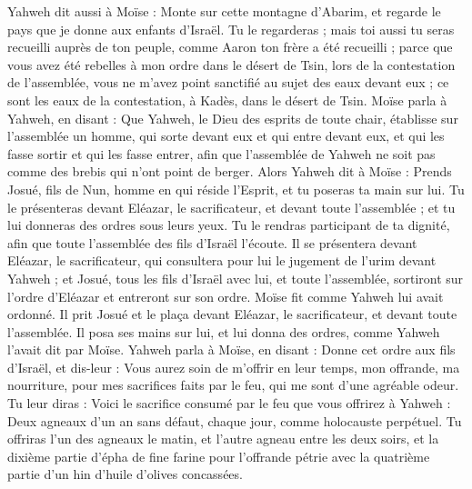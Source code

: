 \begin{multicols}{2}
Yahweh dit aussi à Moïse : Monte sur cette montagne d'Abarim, et regarde le pays que je donne aux enfants d'Israël.
Tu le regarderas ; mais toi aussi tu seras recueilli auprès de ton peuple, comme Aaron ton frère a été recueilli ;
parce que vous avez été rebelles à mon ordre dans le désert de Tsin, lors de la contestation de l'assemblée, vous ne m'avez point sanctifié au sujet des eaux devant eux ; ce sont les eaux de la contestation, à Kadès, dans le désert de Tsin.
Moïse parla à Yahweh, en disant :
Que Yahweh, le Dieu des esprits de toute chair, établisse sur l'assemblée un homme,
qui sorte devant eux et qui entre devant eux, et qui les fasse sortir et qui les fasse entrer, afin que l'assemblée de Yahweh ne soit pas comme des brebis qui n'ont point de berger.
Alors Yahweh dit à Moïse : Prends Josué, fils de Nun, homme en qui réside l'Esprit, et tu poseras ta main sur lui.
Tu le présenteras devant Eléazar, le sacrificateur, et devant toute l'assemblée ; et tu lui donneras des ordres sous leurs yeux.
Tu le rendras participant de ta dignité, afin que toute l'assemblée des fils d'Israël l'écoute.
Il se présentera devant Eléazar, le sacrificateur, qui consultera pour lui le jugement de l'urim devant Yahweh ; et Josué, tous les fils d'Israël avec lui, et toute l'assemblée, sortiront sur l'ordre d'Eléazar et entreront sur son ordre.
Moïse fit comme Yahweh lui avait ordonné. Il prit Josué et le plaça devant Eléazar, le sacrificateur, et devant toute l'assemblée.
Il posa ses mains sur lui, et lui donna des ordres, comme Yahweh l'avait dit par Moïse.
\VerseOne{}Yahweh parla à Moïse, en disant :
Donne cet ordre aux fils d'Israël, et dis-leur : Vous aurez soin de m'offrir en leur temps, mon offrande, ma nourriture, pour mes sacrifices faits par le feu, qui me sont d'une agréable odeur.
Tu leur diras : Voici le sacrifice consumé par le feu que vous offrirez à Yahweh : Deux agneaux d'un an sans défaut, chaque jour, comme holocauste perpétuel.
Tu offriras l'un des agneaux le matin, et l'autre agneau entre les deux soirs,
et la dixième partie d'épha de fine farine pour l'offrande pétrie avec la quatrième partie d'un hin d'huile d'olives concassées.

\end{multicols}
